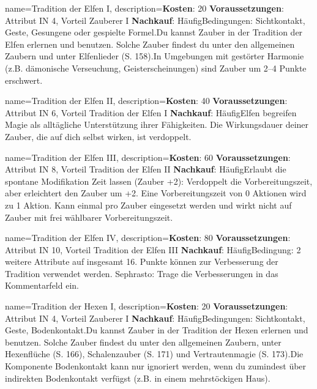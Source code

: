 {
    name={Tradition der Elfen I},
    description={\textbf{Kosten}: 20 \textbf{Voraussetzungen}: Attribut IN 4, Vorteil Zauberer I \textbf{Nachkauf}: Häufig\newline Bedingungen: Sichtkontakt, Geste, Gesungene oder gespielte Formel.\newline Du kannst Zauber in der Tradition der Elfen erlernen und benutzen. Solche Zauber findest du unter den allgemeinen Zaubern und unter Elfenlieder (S. 158).\newline In Umgebungen mit gestörter Harmonie (z.B. dämonische Verseuchung, Geisterscheinungen) sind Zauber um 2–4 Punkte erschwert.}
}


{
    name={Tradition der Elfen II},
    description={\textbf{Kosten}: 40 \textbf{Voraussetzungen}: Attribut IN 6, Vorteil Tradition der Elfen I \textbf{Nachkauf}: Häufig\newline Elfen begreifen Magie als alltägliche Unterstützung ihrer Fähigkeiten. Die Wirkungsdauer deiner Zauber, die auf dich selbst wirken, ist verdoppelt.}
}


{
    name={Tradition der Elfen III},
    description={\textbf{Kosten}: 60 \textbf{Voraussetzungen}: Attribut IN 8, Vorteil Tradition der Elfen II \textbf{Nachkauf}: Häufig\newline Erlaubt die spontane Modifikation Zeit lassen (Zauber +2): Verdoppelt die Vorbereitungszeit, aber erleichtert den Zauber um +2. Eine Vorbereitungszeit von 0 Aktionen wird zu 1 Aktion. Kann einmal pro Zauber eingesetzt werden und wirkt nicht auf Zauber mit frei wählbarer Vorbereitungszeit.}
}


{
    name={Tradition der Elfen IV},
    description={\textbf{Kosten}: 80 \textbf{Voraussetzungen}: Attribut IN 10, Vorteil Tradition der Elfen III \textbf{Nachkauf}: Häufig\newline Bedingung: 2 weitere Attribute auf insgesamt 16. Punkte können zur Verbesserung der Tradition verwendet werden. Sephrasto: Trage die Verbesserungen in das Kommentarfeld ein.}
}


{
    name={Tradition der Hexen I},
    description={\textbf{Kosten}: 20 \textbf{Voraussetzungen}: Attribut IN 4, Vorteil Zauberer I \textbf{Nachkauf}: Häufig\newline Bedingungen: Sichtkontakt, Geste, Bodenkontakt.\newline Du kannst Zauber in der Tradition der Hexen erlernen und benutzen. Solche Zauber findest du unter den allgemeinen Zaubern, unter Hexenflüche (S. 166), Schalenzauber (S. 171) und Vertrautenmagie (S. 173).\newline Die Komponente Bodenkontakt kann nur ignoriert werden, wenn du zumindest über indirekten Bodenkontakt verfügst (z.B. in einem mehrstöckigen Haus).}
}



